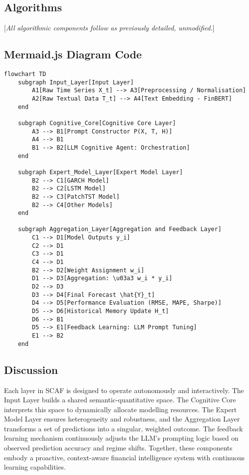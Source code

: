 \documentclass[conference]{IEEEtran}
\begin{document}
\subsection{Algorithms}
[\emph{All algorithmic components follow as previously detailed, unmodified.}]

\subsection{Mermaid.js Diagram Code}
\begin{verbatim}
flowchart TD
    subgraph Input_Layer[Input Layer]
        A1[Raw Time Series X_t] --> A3[Preprocessing / Normalisation]
        A2[Raw Textual Data T_t] --> A4[Text Embedding - FinBERT]
    end

    subgraph Cognitive_Core[Cognitive Core Layer]
        A3 --> B1[Prompt Constructor P(X, T, H)]
        A4 --> B1
        B1 --> B2[LLM Cognitive Agent: Orchestration]
    end

    subgraph Expert_Model_Layer[Expert Model Layer]
        B2 --> C1[GARCH Model]
        B2 --> C2[LSTM Model]
        B2 --> C3[PatchTST Model]
        B2 --> C4[Other Models]
    end

    subgraph Aggregation_Layer[Aggregation and Feedback Layer]
        C1 --> D1[Model Outputs y_i]
        C2 --> D1
        C3 --> D1
        C4 --> D1
        B2 --> D2[Weight Assignment w_i]
        D1 --> D3[Aggregation: \u03a3 w_i * y_i]
        D2 --> D3
        D3 --> D4[Final Forecast \hat{Y}_t]
        D4 --> D5[Performance Evaluation (RMSE, MAPE, Sharpe)]
        D5 --> D6[Historical Memory Update H_t]
        D6 --> B1
        D5 --> E1[Feedback Learning: LLM Prompt Tuning]
        E1 --> B2
    end
\end{verbatim}

\subsection{Discussion}
Each layer in SCAF is designed to operate autonomously and interactively. The Input Layer builds a shared semantic-quantitative space. The Cognitive Core interprets this space to dynamically allocate modelling resources. The Expert Model Layer ensures heterogeneity and robustness, and the Aggregation Layer transforms a set of predictions into a singular, weighted outcome. The feedback learning mechanism continuously adjusts the LLM's prompting logic based on observed prediction accuracy and regime shifts. Together, these components embody a proactive, context-aware financial intelligence system with continuous learning capabilities.
\end{document}
